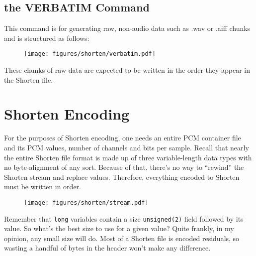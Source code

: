 \subsection{the VERBATIM Command}

This command is for generating raw, non-audio data such
as .wav or .aiff chunks and is structured as follows:
\begin{figure}[h]
\texttt{[image: figures/shorten/verbatim.pdf]}
\end{figure}
\par
\noindent
These chunks of raw data are expected to be written in the order
they appear in the Shorten file.

\pagebreak

\section{Shorten Encoding}

For the purposes of Shorten encoding,
one needs an entire PCM container file and its
PCM values, number of channels and bits per sample.
Recall that nearly the entire Shorten file format is made up
of three variable-length data types with no byte-alignment of any sort.
Because of that, there's no way to ``rewind'' the Shorten stream
and replace values.
Therefore, everything encoded to Shorten must be written in order.

\begin{figure}[h]
\texttt{[image: figures/shorten/stream.pdf]}
\end{figure}
\par
\noindent
Remember that \texttt{long} variables contain a size \texttt{unsigned(2)}
field followed by its value.
So what's the best size to use for a given value?
Quite frankly, in my opinion, any small size will do.
Most of a Shorten file is encoded residuals, so wasting a handful
of bytes in the header won't make any difference.

